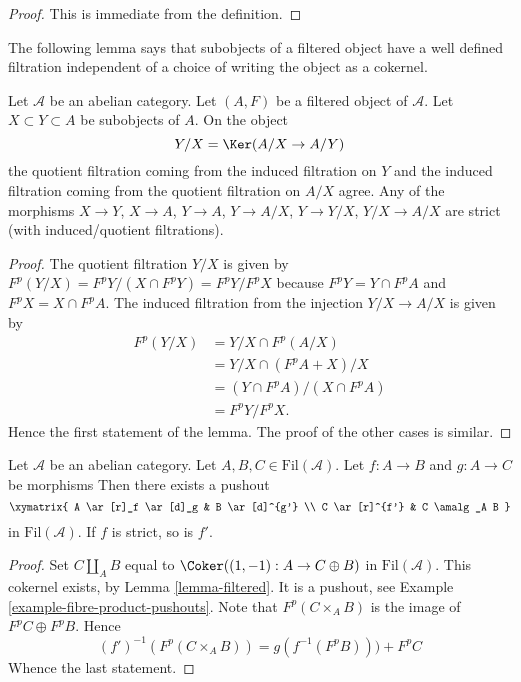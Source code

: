 \begin{proof}
This is immediate from the definition.
\end{proof}

\noindent
The following lemma says that subobjects of a filtered object have a well
defined filtration independent of a choice of writing the object as a
cokernel.

\begin{lemma}
\label{lemma-filtration-subobject}
Let $\mathcal{A}$ be an abelian category.
Let $(A, F)$ be a filtered object of $\mathcal{A}$.
Let $X \subset Y \subset A$ be subobjects of $A$.
On the object
$$
Y/X = \Ker(A/X \to A/Y)
$$
the quotient filtration coming from the induced filtration on $Y$ and the
induced filtration coming from the quotient filtration on $A/X$ agree.
Any of the morphisms $X \to Y$, $X \to A$, $Y \to A$, $Y \to A/X$,
$Y \to Y/X$, $Y/X \to A/X$ are strict (with induced/quotient filtrations).
\end{lemma}

\begin{proof}
The quotient filtration $Y/X$ is given by
$F^p(Y/X) = F^pY/(X \cap F^pY) = F^pY/F^pX$
because $F^pY = Y \cap F^pA$ and $F^pX = X \cap F^pA$.
The induced filtration from the injection $Y/X \to A/X$ is given by
\begin{align*}
F^p(Y/X) & = Y/X \cap F^p(A/X) \\
& = Y/X \cap (F^pA + X)/X \\
& = (Y \cap F^pA)/(X \cap F^pA) \\
& = F^pY/F^pX.
\end{align*}
Hence the first statement of the lemma.
The proof of the other cases is similar.
\end{proof}

\begin{lemma}
\label{lemma-pushout-filtered}
Let $\mathcal{A}$ be an abelian category.
Let $A, B, C \in \text{Fil}(\mathcal{A})$.
Let $f : A \to B$ and $g : A \to C$ be morphisms
Then there exists a pushout
$$
\xymatrix{
A \ar[r]_f \ar[d]_g & B \ar[d]^{g'} \\
C \ar[r]^{f'} & C \amalg_A B
}
$$
in $\text{Fil}(\mathcal{A})$. If $f$ is strict, so is $f'$.
\end{lemma}

\begin{proof}
Set $C \amalg_A B$ equal to $\Coker((1, -1) : A \to C \oplus B)$
in $\text{Fil}(\mathcal{A})$. This cokernel exists, by
Lemma \ref{lemma-filtered}.
It is a pushout, see
Example \ref{example-fibre-product-pushouts}.
Note that $F^p(C \times_A B)$ is the image of $F^pC \oplus F^pB$.
Hence
$$
(f')^{-1}(F^p(C \times_A B)) = g(f^{-1}(F^pB))) + F^pC
$$
Whence the last statement.
\end{proof}

